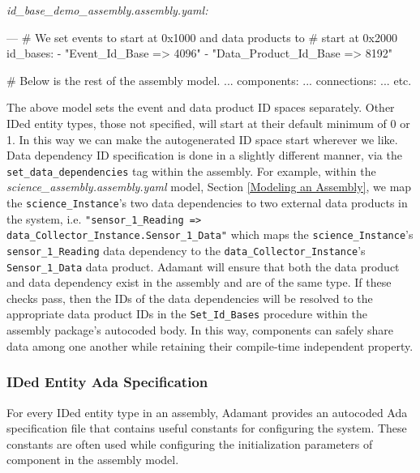 \textit{id\_base\_demo\_assembly.assembly.yaml:}
\vspace{5mm} %
\begin{yamlcode}
---
# We set events to start at  0x1000 and data products to 
# start at 0x2000
id_bases: 
  - "Event_Id_Base => 4096"
  - "Data_Product_Id_Base => 8192"

# Below is the rest of the assembly model.
  ...
components:
  ... 
connections: 
  ...
  etc.
\end{yamlcode}
\vspace{5mm} %

The above model sets the event and data product ID spaces separately. Other IDed entity types, those not specified, will start at their default minimum of 0 or 1. In this way we can make the autogenerated ID space start wherever we like. \\

Data dependency ID specification is done in a slightly different manner, via the \texttt{set\_data\_dependencies} tag within the assembly. For example, within the \textit{science\_assembly.assembly.yaml} model, Section \ref{Modeling an Assembly}, we map the \texttt{science\_Instance}'s two data dependencies to two external data products in the system, i.e. \texttt{"sensor\_1\_Reading => data\_Collector\_Instance.Sensor\_1\_Data"} which maps the \texttt{science\_Instance}'s \texttt{sensor\_1\_Reading} data dependency to the \texttt{data\_Collector\_Instance}'s \texttt{Sensor\_1\_Data} data product. Adamant will ensure that both the data product and data dependency exist in the assembly and are of the same type. If these checks pass, then the IDs of the data dependencies will be resolved to the appropriate data product IDs in the \texttt{Set\_Id\_Bases} procedure within the assembly package's autocoded body. In this way, components can safely share data among one another while retaining their compile-time independent property.

\subsubsection{IDed Entity Ada Specification}

For every IDed entity type in an assembly, Adamant provides an autocoded Ada specification file that contains useful constants for configuring the system. These constants are often used while configuring the initialization parameters of component in the assembly model. \\

